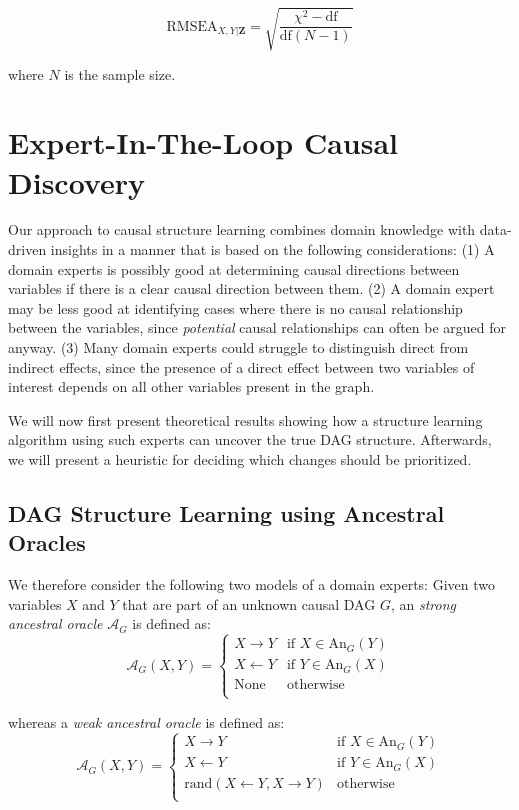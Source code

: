\documentclass{uai2025} %
\begin{document}
\begin{equation}
	\textrm{RMSEA}_{X, Y \rvert \bm{Z}} = \sqrt{\frac{\chi^2 - \textrm{df}}{\textrm{df} (N-1)}}
\end{equation}

where $ N $ is the sample size.

\section{Expert-In-The-Loop Causal Discovery}


Our approach to causal structure learning combines domain knowledge with data-driven
insights in a manner that is based on the following considerations: 
(1) A domain experts is possibly good at determining causal directions between variables if 
there is a clear causal direction between them. (2) A domain expert may be less good
at identifying cases where there is no causal relationship between the variables,
since \emph{potential} causal relationships can often be argued for anyway.
(3) Many domain experts could struggle to distinguish direct from indirect 
effects, since the presence of a direct effect between two variables
of interest depends on all other variables present in the graph. 

We will now first present theoretical results showing how a structure
learning algorithm using such experts can uncover the true DAG structure.
Afterwards, we will present a heuristic for deciding which changes should
be prioritized.

\subsection{DAG Structure Learning using Ancestral Oracles}

\label{sec:modification}

We therefore consider the following two models of a domain experts: Given two variables
$ X $ and $ Y $ that are part of an unknown causal DAG $G$, an \emph{strong ancestral oracle} 
$\mathcal{A}_G$ is defined as:
$$\mathcal{A}_G(X,Y)=\begin{cases}
 X \to Y & \textrm{if } X \in \textrm{An}_G(Y) \\
 X \gets Y & \textrm{if } Y \in \textrm{An}_G(X) \\
 \textrm{None} & \textrm{otherwise} \\
\end{cases}$$

whereas a \emph{weak ancestral oracle} is defined as:
$$
\mathcal{A}_G(X,Y)=\begin{cases}
 X \to Y & \textrm{if } X \in \textrm{An}_G(Y) \\
 X \gets Y & \textrm{if } Y \in \textrm{An}_G(X) \\
 \textrm{rand}(X \gets Y, X \to Y) & \textrm{otherwise} \\
\end{cases}
$$
\end{document}
